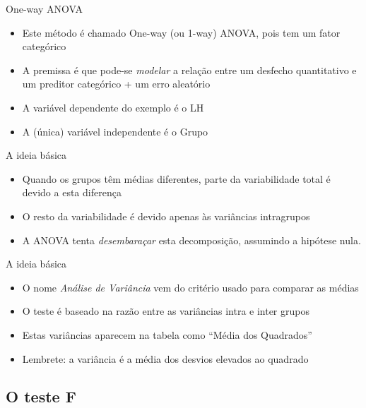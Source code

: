 \documentclass{beamer}
\begin{document}
\begin{frame}{\scriptsize One-way ANOVA}
  \begin{itemize}
    \footnotesize
  \item Este método é chamado One-way (ou 1-way) ANOVA, pois tem um fator categórico
    \bigskip
  \item A premissa é que pode-se {\em modelar} a relação entre um desfecho quantitativo e um preditor categórico + um erro aleatório
    \bigskip
    \bigskip
  \item A variável dependente do exemplo é o LH
  \item A (única) variável independente é o Grupo
  \end{itemize}
\end{frame}

\begin{frame}{\scriptsize A ideia básica}
  \begin{itemize}
    \footnotesize
  \item Quando os grupos têm médias diferentes, parte da variabilidade total é devido a esta diferença
  \item O resto da variabilidade é devido apenas às variâncias intragrupos
    \bigskip
    \bigskip
  \item A ANOVA tenta {\em desembaraçar} esta decomposição, assumindo a hipótese nula.
  \end{itemize}
\end{frame}

\begin{frame}{\scriptsize A ideia básica}
  \begin{itemize}
    \footnotesize
  \item O nome {\em Análise de Variância} vem do critério usado para comparar as médias
    \bigskip
    \bigskip
  \item O teste é baseado na razão entre as variâncias intra e inter grupos
  \item Estas variâncias aparecem na tabela como ``Média dos Quadrados''
    \bigskip
    \bigskip
  \item Lembrete: a variância é a média dos desvios elevados ao quadrado
  \end{itemize}
\end{frame}

\subsection{O teste F}
\end{document}
